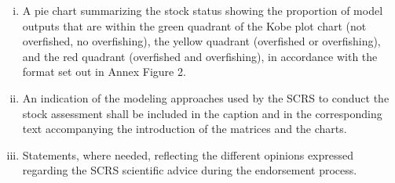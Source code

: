 \begin{enumerate}
\begin{enumerate}[i)]
      \item  A pie chart summarizing the stock status showing the proportion of model outputs that are within the green quadrant of the Kobe plot chart (not overfished, no overfishing), the yellow quadrant (overfished or overfishing), and the red quadrant (overfished and overfishing), in accordance with the format set out in Annex Figure 2.
      \item  An indication of the modeling approaches used by the SCRS to conduct the stock assessment shall be included in the caption and in the corresponding text accompanying the introduction of the matrices and the charts.
      \item  Statements, where needed, reflecting the different opinions expressed regarding the SCRS scientific advice during the endorsement process.
    \end{enumerate}


\end{enumerate}

